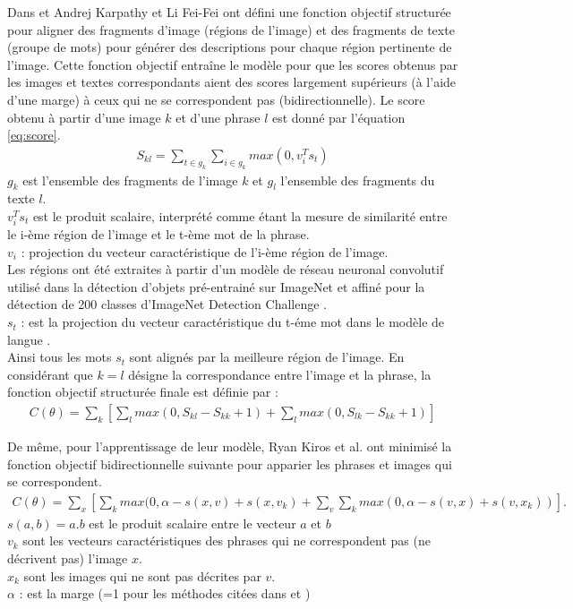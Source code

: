 Dans \cite{karpathy2015deep} et \cite{karpathy2014deep} Andrej Karpathy et Li Fei-Fei ont défini une fonction objectif structurée pour aligner des fragments d'image (régions de l'image) et des fragments de texte (groupe de mots) pour générer des descriptions pour chaque région pertinente de l'image. Cette fonction objectif entraîne le modèle pour que les scores obtenus par les images et textes correspondants aient des scores largement supérieurs (à l'aide d'une marge) à ceux qui ne se correspondent pas (bidirectionnelle). Le score obtenu à partir d'une image $k$ et d'une phrase $l$ est donné par l'équation \ref{eq:score}.
\begin{eqnarray}
\label{eq:score}
S_{kl}=\sum_{t\in g_{k}} \sum_{i\in g_{k}}max(0,v^{T}_{i} s_{t})
\end{eqnarray}
$g_{k}$ est l'ensemble des fragments de l'image $k$ et $ g_{l}$ l'ensemble des fragments du texte $l$.\\
$ v^{T}_{i} s_{t}$ est le produit scalaire, interprété comme étant la mesure de similarité entre le i-ème région de l'image et le t-ème mot de la phrase.\\
$v_{i}$ : projection du vecteur caractéristique de l'i-ème région de l'image.\\ Les régions ont été extraites à partir d'un modèle de réseau neuronal convolutif utilisé dans la détection d'objets \cite{jitendramalikrich} pré-entrainé sur ImageNet et affiné pour la détection de 200 classes d'ImageNet Detection Challenge \cite{russakovsky2015imagenet}.\\
$s_{t}$ : est la projection du vecteur caractéristique du t-éme mot dans  le modèle de langue \cite{karpathy2015deep} \cite{karpathy2014deep}. \\

Ainsi tous les mots $s_{t}$ sont alignés par la meilleure région de l'image. En considérant que $k=l$ désigne la correspondance entre l'image et la phrase, la fonction objectif structurée finale est définie par :
\begin{eqnarray}
C(\theta)= \sum_{k}[\sum_{l}max(0,S_{kl}-S_{kk}+1)+\sum_{l}max(0,S_{lk}-S_{kk}+1)]
\end{eqnarray}

\qquad	De même, pour l'apprentissage de leur modèle, Ryan Kiros et al. \cite{kiros2014unifying} ont minimisé la fonction objectif bidirectionnelle suivante pour apparier les phrases et images qui se correspondent.\\
\begin{eqnarray}
C(\theta)= \sum_{x}[\sum_{k}max(0,\alpha - s(x,v)+ s(x,v_k) + \sum_{v} \sum_{k} max(0,\alpha - s(v,x)+s(v,x_k))].
\end{eqnarray}
$s(a,b) = a.b$ est le produit scalaire entre le vecteur $a$ et $b$\\
$v_k$  sont les vecteurs caractéristiques des phrases qui ne correspondent pas (ne décrivent pas) l'image $x$.\\
$x_k$ sont les images qui ne sont pas décrites par $v$.\\
$\alpha$ : est la marge (=1 pour les méthodes citées dans \cite{karpathy2015deep} et \cite{karpathy2014deep})


